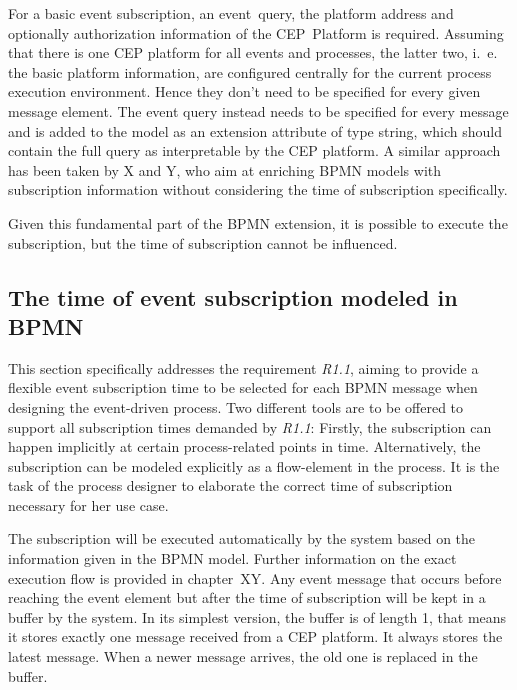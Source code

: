 For a basic event subscription, an event~query, the platform address and optionally authorization information of the CEP~Platform is required. 
Assuming that there is one CEP platform for all events and processes, the latter two, i.~e. the basic platform information, are configured centrally for the current process execution environment. Hence they don't need to be specified for every given message element. 
The event query instead needs to be specified for every message and is added to the model as an extension attribute of type string, which should contain the full query as interpretable by the CEP platform.
A similar approach has been taken by X and Y, who aim at enriching BPMN models with subscription information without considering the time of subscription specifically.

Given this fundamental part of the BPMN extension, it is possible to execute the subscription, but the time of subscription cannot be influenced.

\subsection{The time of event subscription modeled in BPMN}

This section specifically addresses the requirement \textit{R1.1}, aiming to provide a flexible event subscription time to be selected for each BPMN message when designing the event-driven process.
Two different tools are to be offered to support all subscription times demanded by \textit{R1.1}: Firstly, the subscription can happen implicitly at certain process-related points in time. Alternatively, the subscription can be modeled explicitly as a flow-element in the process.
It is the task of the process designer to elaborate the correct time of subscription necessary for her use case.

The subscription will be executed automatically by the system based on the information given in the BPMN model. Further information on the exact execution flow is provided in chapter~XY. 
Any event message that occurs before reaching the event element but after the time of subscription will be kept in a buffer by the system.
In its simplest version, the buffer is of length 1, that means it stores exactly one message received from a CEP platform. It always stores the latest message. When a newer message arrives, the old one is replaced in the buffer.

